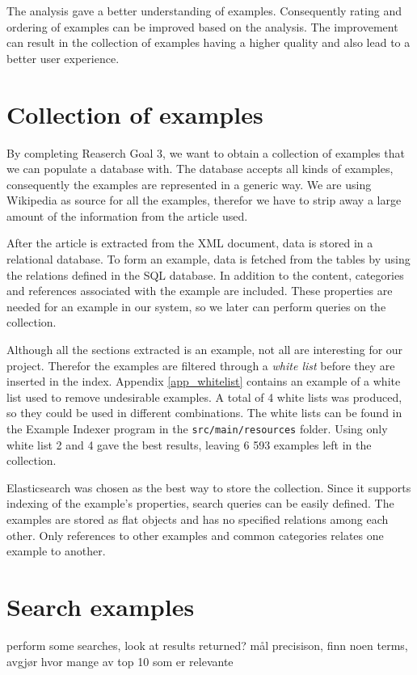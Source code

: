 The analysis gave a better understanding of examples. Consequently rating and ordering of examples can be improved based on the analysis. 
The improvement can result in the collection of examples having a higher quality and also lead to a better user experience. 


\section{Collection of examples}
By completing Reaserch Goal 3, we want to obtain a collection of examples that we can populate a database with. The database accepts all kinds of examples, consequently the examples are represented in a generic way. We are using Wikipedia as source for all the examples, therefor we have to strip away a large amount of the information from the article used. 

After the article is extracted from the XML document, data is stored in a relational database. To form an example, data is fetched from the tables by using the relations defined in the SQL database. In addition to the content, categories and references associated with the example are included. These properties are needed for an example in our system, so we later can perform queries on the collection.

Although all the sections extracted is an example, not all are interesting for our project. Therefor the examples are filtered through a \textit{white list} before they are inserted in the index. Appendix \ref{app_whitelist} contains an example of a white list used to remove undesirable examples. A total of 4 white lists was produced, so they could be used in different combinations. The white lists can be found in the Example Indexer program in the \texttt{src/main/resources} folder.
Using only white list 2 and 4 gave the best results, leaving 6 593 examples left in the collection.

Elasticsearch was chosen as the best way to store the collection. Since it supports indexing of the example's properties, search queries can be easily defined. The examples are stored as flat objects and has no specified relations among each other. Only references to other examples and common categories relates one example to another.


\section{Search examples}

perform some searches, look at results returned?
mål precisison, finn noen terms, avgjør hvor mange av top 10 som er relevante

\cleardoublepage